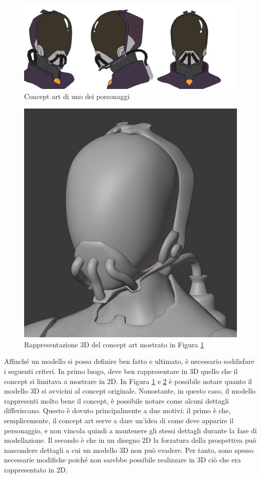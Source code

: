 \begin{figure}
\centering
\includegraphics[width=.8\textwidth]{Figures/bandit-concept}
\decoRule
\caption[Concept art]{Concept art di uno dei porsonaggi}
\label{fig:concept}
\end{figure}
\begin{figure}
\centering
\includegraphics[width=.8\textwidth]{Figures/bandit-head}
\decoRule
\caption[Modello 3D]{Rappresentazione 3D del concept art mostrato in Figura \ref{fig:concept}}
\label{fig:model}
\end{figure}
Affinché un modello si possa definire ben fatto e ultimato, è necessario soddisfare i seguenti criteri.
In primo luogo, deve ben rappresentare in 3D quello che il concept si limitava a mostrare in 2D.
In Figura \ref{fig:concept} e \ref{fig:model} è possibile notare quanto il modello 3D si avvicini al concept originale.
Nonostante, in questo caso, il modello rappresenti molto bene il concept, è possibile notare come alcuni dettagli differiscano.
Questo è dovuto principalmente a due motivi: il primo è che, semplicemente, il concept art serve a dare un'idea di come deve apparire il personaggio, e non vincola quindi a mantenere gli stessi dettagli durante la fase di modellazione.
Il secondo è che in un disegno 2D la forzatura della prospettiva può nascondere dettagli a cui un modello 3D non può evadere.
Per tanto, sono spesso necessarie modifiche poiché non sarebbe possibile realizzare in 3D ciò che era rappresentato in 2D.

